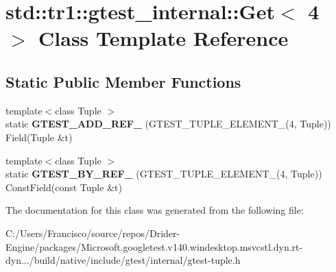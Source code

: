 \hypertarget{classstd_1_1tr1_1_1gtest__internal_1_1_get_3_014_01_4}{}\section{std\+:\+:tr1\+:\+:gtest\+\_\+internal\+:\+:Get$<$ 4 $>$ Class Template Reference}
\label{classstd_1_1tr1_1_1gtest__internal_1_1_get_3_014_01_4}
\subsection*{Static Public Member Functions}
\begin{DoxyCompactItemize}
\item 
\mbox{\label{classstd_1_1tr1_1_1gtest__internal_1_1_get_3_014_01_4_a5c7a91c681118bb7253e305f8ff42be4}} 
{\footnotesize template$<$class Tuple $>$ }\\static {\bfseries G\+T\+E\+S\+T\+\_\+\+A\+D\+D\+\_\+\+R\+E\+F\+\_\+} (G\+T\+E\+S\+T\+\_\+\+T\+U\+P\+L\+E\+\_\+\+E\+L\+E\+M\+E\+N\+T\+\_\+(4, Tuple)) Field(Tuple \&t)
\item 
\mbox{\label{classstd_1_1tr1_1_1gtest__internal_1_1_get_3_014_01_4_a04794c398bbe81e4de0915b79da2166a}} 
{\footnotesize template$<$class Tuple $>$ }\\static {\bfseries G\+T\+E\+S\+T\+\_\+\+B\+Y\+\_\+\+R\+E\+F\+\_\+} (G\+T\+E\+S\+T\+\_\+\+T\+U\+P\+L\+E\+\_\+\+E\+L\+E\+M\+E\+N\+T\+\_\+(4, Tuple)) Const\+Field(const Tuple \&t)
\end{DoxyCompactItemize}


The documentation for this class was generated from the following file\+:\begin{DoxyCompactItemize}
\item 
C\+:/\+Users/\+Francisco/source/repos/\+Drider-\/\+Engine/packages/\+Microsoft.\+googletest.\+v140.\+windesktop.\+msvcstl.\+dyn.\+rt-\/dyn.../build/native/include/gtest/internal/gtest-\/tuple.\+h\end{DoxyCompactItemize}
